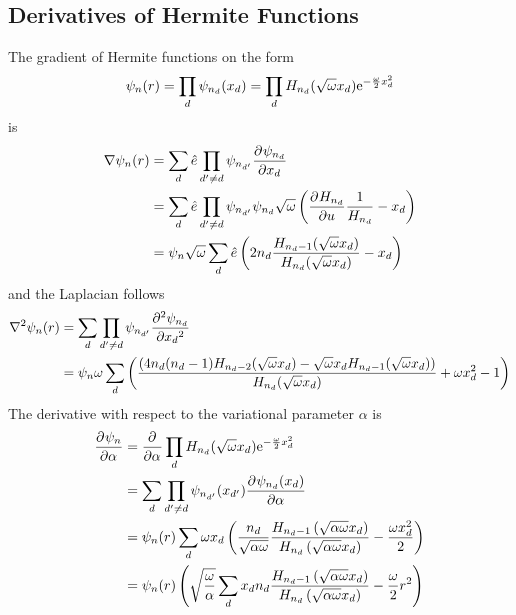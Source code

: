 
\chapter{\label{appendix:B}}

\section{Derivatives of Hermite Functions}
    The gradient of Hermite functions on the form
        \begin{equation}
            \psi_n(r) = \prod_d \psi_{n_d}(x_d) = \prod_d
            H_{n_d}(\sqrt{\omega}x_d)\mathrm{e}^{-\frac{\omega}{2}x^2_d}
        \end{equation}
    is
        \begin{align}
            \nabla \psi_n(r) &= \sum_d\hat{e} \prod_{d'\neq d} \psi_{n_{d'}}
            \prd{x_d}[\psi_{n_d}] \nonumber \\
            &= \sum_d\hat{e} \prod_{d'\neq d} \psi_{n_{d'}} \psi_{n_d}
            \sqrt{\omega} \left(\prd{u}[H_{n_d}]\frac{1}{H_{n_d}} - x_d\right)
            \nonumber \\
            &= \psi_n\sqrt{\omega}\sum_d \hat{e}
            \left(2n_d\frac{H_{n_d-1}(\sqrt{\omega}x_d)}
            {H_{n_d}(\sqrt{\omega}x_d)} - x_d\right)
        \end{align}
    and the Laplacian follows
        \begin{align}
            \nabla^2 \psi_n(r) &= \sum_d \prod_{d'\neq d} \psi_{n_{d'}}
            \prd{x_d}[\psi_{n_d}][2] \nonumber \\
            &= \psi_n\omega\sum_d
            \left(\frac{\left(4n_d(n_d-1)H_{n_d-2}(\sqrt{\omega}x_d) -
            \sqrt{\omega}x_dH_{n_d-1}(\sqrt{\omega}x_d)\right)}
            {H_{n_d}(\sqrt{\omega}x_d)} + \omega x^2_d - 1\right)
        \end{align}
    The derivative with respect to the variational parameter $\alpha$ is
        \begin{align}
            \prd{\alpha}[\psi_n] &= \prd{\alpha} \prod_d
            H_{n_d}(\sqrt{\omega}x_d)\me^{-\frac{\omega}{2}x^2_d} \nonumber \\
            &= \sum_d \prod_{d'\neq d} \psi_{n_{d'}}(x_{d'})
            \prd{\alpha}[\psi_{n_d}(x_d)] \nonumber \\
            &= \psi_n(r)\sum_d \omega x_d\left(\frac{n_d}{\sqrt{\alpha\omega}}
            \frac{H_{n_d-1}\left(\sqrt{\alpha\omega}x_d\right)}
            {H_{n_d}\left(\sqrt{\alpha\omega}x_d\right)} - \frac{\omega
            x^2_d}{2}\right) \nonumber \\
            &= \psi_n(r)\left(\sqrt{\frac{\omega}{\alpha}} \sum_d x_dn_d
            \frac{H_{n_d-1}\left(\sqrt{\alpha\omega}x_d\right)}
            {H_{n_d}\left(\sqrt{\alpha\omega}x_d\right)} -
            \frac{\omega}{2}r^2\right)
        \end{align}

